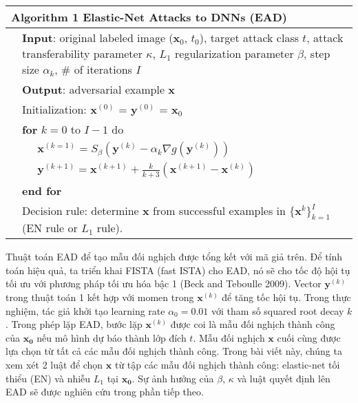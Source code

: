 \begin{center}
	\begin{tabular}{lll}
		\hline 
		\multicolumn{3}{l}{\textbf{Algorithm 1} Elastic-Net Attacks to DNNs (EAD)} \\
		\hline 
		& \multicolumn{2}{p{14cm}}{\textbf{Input}: original labeled image ($\mathbf{x}_0$, $t_0$), target attack class $t$, attack transferability parameter $\kappa$, $L_1$ regularization parameter $\beta$, step size $\alpha_k$, \# of iterations $I$} \\
		& \multicolumn{2}{l}{\textbf{Output}: adversarial example $\mathbf{x}$} \\
		& \multicolumn{2}{l}{Initialization: $\mathbf{x}^{(0)}$ = $\mathbf{y}^{(0)}$ = $\mathbf{x}_0$} \\
		& \multicolumn{2}{l}{\textbf{for} $k = 0$ to $I - 1$ do} \\
		&& $\mathbf{x}^{(k=1)} = S_{\beta}(\mathbf{y}^{(k)} -\alpha_{k} \nabla g(\mathbf{y}^{(k)}))$ \\
		&& $\mathbf{y}^{(k+1)} = \mathbf{x}^{(k+1)} + \frac{k}{k+3} (\mathbf{x}^{(k+1)} - \mathbf{x}^{(k)}) $ \\
		& \multicolumn{2}{l}{\textbf{end for}} \\
		& \multicolumn{2}{p{14cm}}{Decision rule: determine $\mathbf{x}$ from successful examples in $\{\mathbf{x}^k\}_{k=1}^{I}$ (EN rule or $L_1$ rule).}\\
		\hline
	\end{tabular}
	\label{arg:ag_1}
\end{center}

Thuật toán EAD để tạo mẫu đối nghịch được tổng kết với mã giả trên. Để tính toán hiệu quả,
 ta triển khai FISTA (fast ISTA) cho EAD, nó sẽ cho tốc độ hội tụ tối ưu với phương pháp 
 tối ưu hóa bậc 1 (Beck and Teboulle 2009). Vector $\mathbf{y}^{(k)}$ trong thuật toán 1 
 kết hợp với momen trong $\mathbf{x}^{(k)}$ để tăng tốc hội tụ. Trong thực nghiệm, tác giả khởi tạo learning rate $\alpha_0 = 0.01$ với tham số squared root decay $k$. Trong phép lặp EAD, bước lặp $\mathbf{x}^{(k)}$ 
 được coi là mẫu đối nghịch thành công của $\mathbf{x_0}$ nếu mô hình dự báo thành lớp 
 đích $t$. Mẫu đối nghịch $\mathbf{x}$ cuối cùng được lựa chọn từ tất cả các mẫu đối nghịch 
 thành công. Trong bài viết này, chúng ta xem xét 2 luật để chọn $\mathbf{x}$ từ tập các 
 mẫu đối nghịch thành công: elastic-net tối thiểu (EN) và nhiễu $L_1$ tại $\mathbf{x_0}$.
Sự ảnh hưởng của $\beta$, $\kappa$  và luật quyết định lên EAD sẽ được nghiên cứu trong phần tiếp theo.

